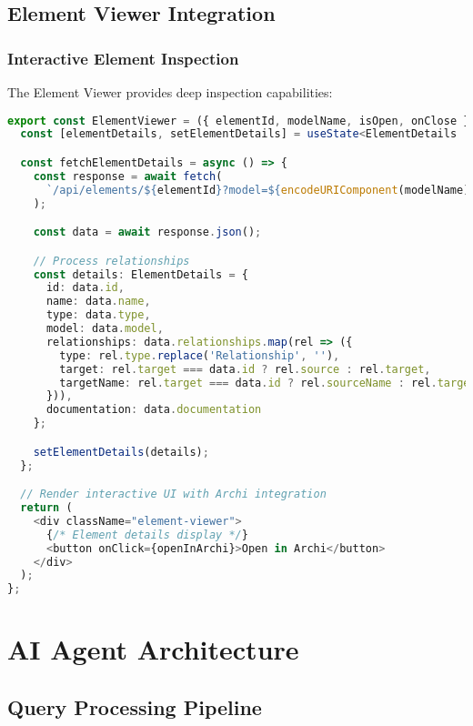 \documentclass[12pt,a4paper]{report}
\begin{document}
\section{Element Viewer Integration}

\subsection{Interactive Element Inspection}

The Element Viewer provides deep inspection capabilities:

\begin{lstlisting}[language=TypeScript, caption=Element Viewer Implementation]
export const ElementViewer = ({ elementId, modelName, isOpen, onClose }) => {
  const [elementDetails, setElementDetails] = useState<ElementDetails | null>(null);

  const fetchElementDetails = async () => {
    const response = await fetch(
      `/api/elements/${elementId}?model=${encodeURIComponent(modelName)}`
    );

    const data = await response.json();

    // Process relationships
    const details: ElementDetails = {
      id: data.id,
      name: data.name,
      type: data.type,
      model: data.model,
      relationships: data.relationships.map(rel => ({
        type: rel.type.replace('Relationship', ''),
        target: rel.target === data.id ? rel.source : rel.target,
        targetName: rel.target === data.id ? rel.sourceName : rel.targetName
      })),
      documentation: data.documentation
    };

    setElementDetails(details);
  };

  // Render interactive UI with Archi integration
  return (
    <div className="element-viewer">
      {/* Element details display */}
      <button onClick={openInArchi}>Open in Archi</button>
    </div>
  );
};
\end{lstlisting}

\chapter{AI Agent Architecture}

\section{Query Processing Pipeline}
\end{document}
